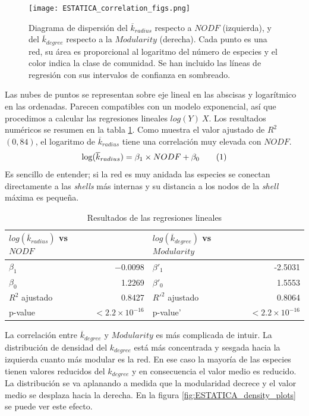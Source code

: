 \begin{figure}[h!]
\centering
\texttt{[image: ESTATICA\_correlation\_figs.png]}
\caption {Diagrama de dispersión del $\overline {k}_{radius}$ respecto a $NODF$ (izquierda), y del $\overline {k}_{degree}$ respecto a la $Modularity$ (derecha). Cada punto es una red, su área es proporcional al logaritmo del número de especies y el color indica la clase de comunidad. Se han incluido las líneas de regresión con sus intervalos de confianza en sombreado.}
\label{fig:ESTATICA_corrfigs}
\end{figure}

Las nubes de puntos se representan sobre eje lineal en las abscisas y logarítmico en las ordenadas. Parecen compatibles con un modelo exponencial, así que procedimos a calcular las regresiones lineales $log(Y) ~ X$. Los resultados numéricos se resumen en la tabla \ref{table:table_lmodel}. Como muestra el valor ajustado de $R^2$ $(0,84)$, el logaritmo de $\overline {k}_{radius}$ tiene una correlación muy elevada con $NODF$. 
\begin{align}
\displaystyle \log({\overline k_{radius}}) = \beta_1 \times NODF + \beta_0
\stepcounter{equation}\tag{\theequation}\label{eq:kradius_vs_nodf}
\end{align}
Es sencillo de entender; si la red es muy anidada las especies se conectan directamente a las \textit{shells} más internas y su distancia a los nodos de la \textit{shell} máxima es pequeña. 

\begin{table}[ht]
\centering
\begin{tabular}{|l r | l r|}
\hline
$log(\overline {k}_{radius})$ vs $NODF$& & $log(\overline {k}_{degree})$ vs $Modularity$ & \\
\hline
$\beta_1$ & $-$0.0098 & $\beta'_1$ & -2.5031 \\
$\beta_0$ & 1.2269 & $\beta'_0$ & 1.5553 \\
$R^2$ ajustado&  0.8427  & $R'^2$ ajustado& 0.8064\\
p-value & $<2.2 \times 10^{-16}$& p-value' & $<2.2 \times 10^{-16}$\\
\hline
\end{tabular}
\caption{\label{table:table_lmodel} Resultados de las regresiones lineales}
\end{table}

La correlación entre $\overline {k}_{degree}$ y $Modularity$ es más complicada de intuir. La distribución de densidad del $k_{degree}$ está más concentrada y sesgada hacia la izquierda cuanto más modular es la red. En ese caso la mayoría de las especies tienen valores reducidos del ${k}_{degree}$ y en consecuencia el valor medio es reducido. La distribución se va aplanando a medida que la modularidad decrece y el valor medio se desplaza hacia la derecha. En la figura \ref{fig:ESTATICA_density_plots} se puede ver este efecto.

